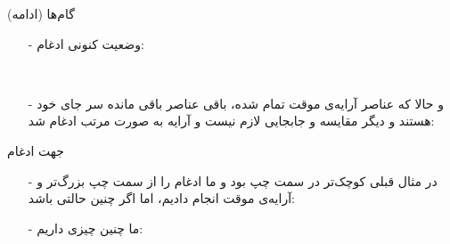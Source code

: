 \begin{frame}{گام‌ها (ادامه)}
\begin{itemize}\itemr
\item[-]
وضعیت کنونی ادغام:
\begin{lfl}
\\
\end{lfl}
\item[-]
و حالا که عناصر آرایه‌ی موقت تمام شده، باقی عناصر باقی مانده سر جای خود هستند و دیگر مقایسه و جابجایی لازم نیست و آرایه به صورت مرتب ادغام شد:

\begin{lfl}
\end{lfl}
\end{itemize}
\end{frame}

\begin{frame}{جهت ادغام}
\begin{itemize}\itemr
\item[-]
در مثال قبلی  کوچک‌تر در سمت چپ بود و ما ادغام را از سمت چپ  بزرگ‌تر و آرایه‌ی موقت انجام دادیم، اما اگر چنین حالتی باشد:
\begin{lfl}
\end{lfl}

\item[-]
ما چنین چیزی داریم:
\begin{lfl}
\\
\end{lfl}
\end{itemize}
\end{frame}

